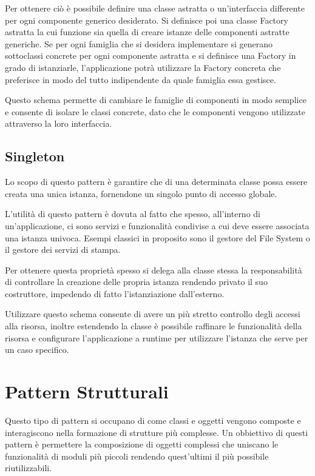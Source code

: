Per ottenere ciò è possibile definire una classe astratta o un'interfaccia differente per ogni componente generico desiderato.
Si definisce poi una classe Factory astratta la cui funzione sia quella di creare istanze delle componenti astratte generiche. Se per ogni famiglia che si desidera implementare si generano sottoclassi concrete per ogni componente astratta e si definisce una Factory in grado di istanziarle, l'applicazione potrà utilizzare la Factory concreta che preferisce in modo del tutto indipendente da quale famiglia essa gestisce.

Questo schema permette di cambiare le famiglie di componenti in modo semplice e consente di isolare le classi concrete, dato che le componenti vengono utilizzate attraverso la loro interfaccia.

\subsection{Singleton}
\label{sub:singleton}
Lo scopo di questo pattern è garantire che di una determinata classe possa essere creata una unica istanza, fornendone un singolo punto di accesso globale.

L'utilità di questo pattern è dovuta al fatto che spesso, all'interno di un'applicazione, ci sono servizi e funzionalità condivise a cui deve essere associata una istanza univoca. Esempi classici in proposito sono il gestore del File System o il gestore dei servizi di stampa.

Per ottenere questa proprietà spesso si delega alla classe stessa la responsabilità di controllare la creazione delle propria istanza rendendo privato il suo costruttore, impedendo di fatto l'istanziazione dall'esterno.

Utilizzare questo schema consente di avere un più stretto controllo degli accessi alla risorsa, inoltre estendendo la classe è possibile raffinare le funzionalità della risorsa e configurare l'applicazione a runtime per utilizzare l'istanza che serve per un caso specifico.

\section{Pattern Strutturali}
Questo tipo di pattern si occupano di come classi e oggetti vengono composte e interagiscono nella formazione di strutture più complesse. 
Un obbiettivo di questi pattern è permettere la composizione di oggetti complessi che uniscano le funzionalità di moduli più piccoli rendendo quest'ultimi il più possibile riutilizzabili.

